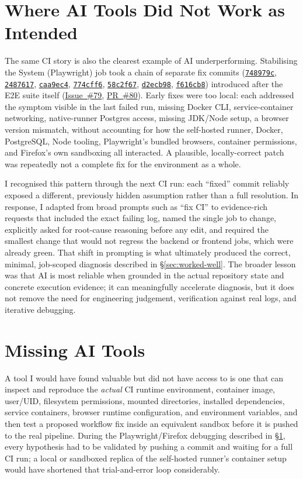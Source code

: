 \documentclass[11pt,a4paper]{article}
\newcommand{\repourl}{https://github.com/se2p-classrooms/final-project-ayoubalila}
\newcommand{\ghissue}[1]{\href{\repourl/issues/#1}{Issue~\##1}}
\newcommand{\ghpr}[1]{\href{\repourl/pull/#1}{PR~\##1}}
\newcommand{\ghcommit}[1]{\href{\repourl/commit/#1}{\texttt{#1}}}
\begin{document}
\newpage
\section{Where AI Tools Did Not Work as Intended}
\label{sec:not-intended}

The same CI story is also the clearest example of AI underperforming. Stabilising the System (Playwright) job took a chain of separate fix commits (\ghcommit{748979c}, \ghcommit{2487617}, \ghcommit{caa9ec4}, \ghcommit{774cff6}, \ghcommit{58c2f67}, \ghcommit{d2ecb98}, \ghcommit{f616cb8}) introduced after the E2E suite itself (\ghissue{79}, \ghpr{80}). Early fixes were too local: each addressed the symptom visible in the last failed run, missing Docker CLI, service-container networking, native-runner Postgres access, missing JDK/Node setup, a browser version mismatch, without accounting for how the self-hosted runner, Docker, PostgreSQL, Node tooling, Playwright's bundled browsers, container permissions, and Firefox's own sandboxing all interacted. A plausible, locally-correct patch was repeatedly not a complete fix for the environment as a whole.

I recognised this pattern through the next CI run: each ``fixed'' commit reliably exposed a different, previously hidden assumption rather than a full resolution. In response, I adapted from broad prompts such as ``fix CI'' to evidence-rich requests that included the exact failing log, named the single job to change, explicitly asked for root-cause reasoning before any edit, and required the smallest change that would not regress the backend or frontend jobs, which were already green. That shift in prompting is what ultimately produced the correct, minimal, job-scoped diagnosis described in \S\ref{sec:worked-well}. The broader lesson was that AI is most reliable when grounded in the actual repository state and concrete execution evidence; it can meaningfully accelerate diagnosis, but it does not remove the need for engineering judgement, verification against real logs, and iterative debugging.

\section{Missing AI Tools}

A tool I would have found valuable but did not have access to is one that can inspect and reproduce the \emph{actual} CI runtime environment, container image, user/UID, filesystem permissions, mounted directories, installed dependencies, service containers, browser runtime configuration, and environment variables, and then test a proposed workflow fix inside an equivalent sandbox before it is pushed to the real pipeline. During the Playwright/Firefox debugging described in \S\ref{sec:not-intended}, every hypothesis had to be validated by pushing a commit and waiting for a full CI run; a local or sandboxed replica of the self-hosted runner's container setup would have shortened that trial-and-error loop considerably.
\end{document}
